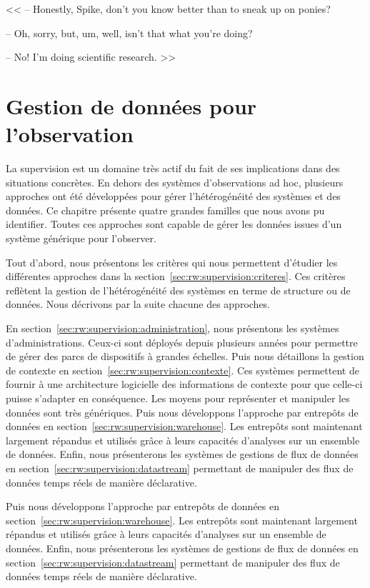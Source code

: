 \begin{savequote}[6cm]
<< -- Honestly, Spike, don't you know better than to sneak up on ponies?

-- Oh, sorry, but, um, well, isn't that what you're doing?

-- No! I'm doing scientific research. >>
\end{savequote}

\chapter{Gestion de données pour l'observation}\label{chap:rw:supervision}
\chaptertoc

La supervision est un domaine très actif du fait de ses implications dans des situations concrètes. En dehors des systèmes d'observations ad hoc, plusieurs approches ont été développées pour gérer l'hétérogénéité des systèmes et des données. Ce chapitre présente quatre grandes familles que nous avons pu identifier. Toutes ces approches sont capable de gérer les données issues d'un système générique pour l'observer.

Tout d'abord, nous présentons les critères qui nous permettent d'étudier les différentes approches dans la section~\ref{sec:rw:supervision:criteres}. Ces critères reflètent la gestion de l'hétérogénéité des systèmes en terme de structure ou de données. Nous décrivons par la suite chacune des approches.

En section~\ref{sec:rw:supervision:administration}, nous présentons les systèmes d'administrations. Ceux-ci sont déployés depuis plusieurs années pour permettre de gérer des parcs de dispositifs à grandes échelles. Puis nous détaillons la gestion de contexte en section~\ref{sec:rw:supervision:contexte}. Ces systèmes permettent de fournir à une architecture logicielle des informations de contexte pour que celle-ci puisse s'adapter en conséquence. Les moyens pour représenter et manipuler les données sont très génériques. Puis nous développons l'approche par entrepôts de données en section~\ref{sec:rw:supervision:warehouse}. Les entrepôts sont maintenant largement répandus et utilisés grâce à leurs capacités d'analyses sur un ensemble de données. Enfin, nous présenterons les systèmes de gestions de flux de données en section~\ref{sec:rw:supervision:datastream} permettant de manipuler des flux de données temps réels de manière déclarative.

Puis nous développons l'approche par entrepôts de données en section~\ref{sec:rw:supervision:warehouse}. Les entrepôts sont maintenant largement répandus et utilisés grâce à leurs capacités d'analyses sur un ensemble de données. Enfin, nous présenterons les systèmes de gestions de flux de données en section~\ref{sec:rw:supervision:datastream} permettant de manipuler des flux de données temps réels de manière déclarative.







